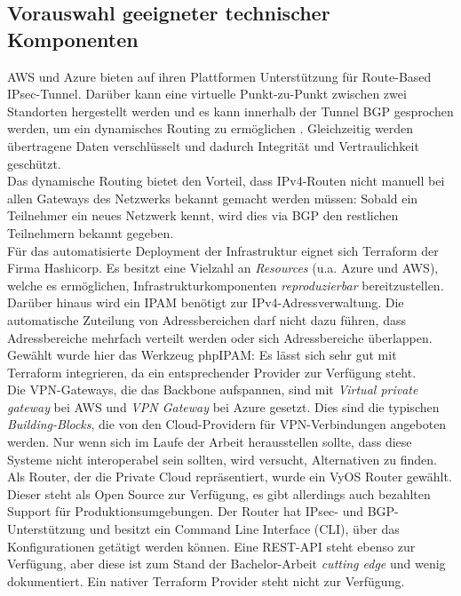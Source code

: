 \subsection{Vorauswahl geeigneter technischer Komponenten}
AWS und Azure bieten auf ihren Plattformen Unterstützung für Route-Based \gls{IPsec}-Tunnel\cite[S.32]{awsvpn2021}. Darüber kann eine virtuelle Punkt-zu-Punkt zwischen zwei Standorten hergestellt werden und es kann innerhalb der Tunnel \gls{BGP} gesprochen werden, um ein dynamisches Routing zu ermöglichen\cite[S. 18]{AlShawi2020} \cite[S. 74-79]{Toroman2019}. Gleichzeitig werden übertragene Daten verschlüsselt und dadurch Integrität und Vertraulichkeit geschützt.\\
Das dynamische Routing bietet den Vorteil, dass IPv4-Routen nicht manuell bei allen Gateways des Netzwerks bekannt gemacht werden müssen: Sobald ein Teilnehmer ein neues Netzwerk kennt, wird dies via \gls{BGP} den restlichen Teilnehmern bekannt gegeben.\\
Für das automatisierte \gls{Deployment} der Infrastruktur eignet sich Terraform der Firma Hashicorp. Es besitzt eine Vielzahl an \textit{Resources} (u.a. Azure und AWS), welche es ermöglichen, Infrastrukturkomponenten \textit{reproduzierbar} bereitzustellen.\\
Darüber hinaus wird ein \gls{IPAM} benötigt zur IPv4-Adressverwaltung. Die automatische Zuteilung von Adressbereichen darf nicht dazu führen, dass Adressbereiche mehrfach verteilt werden oder sich Adressbereiche überlappen. Gewählt wurde hier das Werkzeug phpIPAM\cite{phpipam2020}: Es lässt sich sehr gut mit Terraform integrieren, da ein entsprechender Provider zur Verfügung steht\cite{phpipamtf2020}.\\
Die \gls{VPN-Gateway}s, die das Backbone aufspannen, sind mit \textit{Virtual private gateway} bei AWS und \textit{VPN Gateway} bei Azure gesetzt. Dies sind die typischen \textit{Building-Blocks}, die von den Cloud-Providern für \gls{VPN}-Verbindungen angeboten werden. Nur wenn sich im Laufe der Arbeit herausstellen sollte, dass diese Systeme nicht interoperabel sein sollten, wird versucht, Alternativen zu finden.\\
Als Router, der die Private Cloud repräsentiert, wurde ein VyOS Router gewählt. Dieser steht als Open Source zur Verfügung, es gibt allerdings auch bezahlten Support für Produktionsumgebungen. Der Router hat \gls{IPsec}- und \gls{BGP}-Unterstützung und besitzt ein Command Line Interface (CLI), über das Konfigurationen getätigt werden können. Eine REST-API steht ebenso zur Verfügung, aber diese ist zum Stand der Bachelor-Arbeit \textit{cutting edge} und wenig dokumentiert\cite{vyosapi2021}. Ein nativer Terraform Provider steht nicht zur Verfügung.\\
